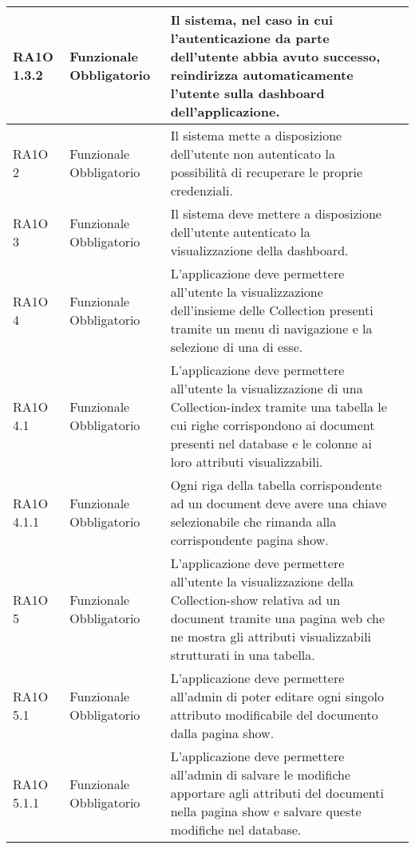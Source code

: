 \begin{center}
\begin{longtable}{ | p{2cm} | p{2cm} | p{5cm} | p{2cm} |}
        RA1O 1.3.2 & Funzionale \newline  Obbligatorio  & Il sistema, nel caso in cui l'autenticazione da parte dell'utente abbia avuto successo, reindirizza automaticamente l'utente sulla dashboard dell'applicazione.
 &  \\ \hline      
        RA1O 2  & Funzionale \newline  Obbligatorio  & Il sistema mette a disposizione dell'utente non autenticato la possibilità  di recuperare le proprie credenziali. &  \\ \hline      
        RA1O 3  & Funzionale \newline  Obbligatorio  & Il sistema deve mettere a disposizione dell'utente autenticato la visualizzazione della dashboard. &  \\ \hline      
        RA1O 4 & Funzionale \newline  Obbligatorio  & L'applicazione deve permettere all'utente la visualizzazione dell'insieme delle Collection presenti tramite un menu di navigazione e la selezione di una di esse. &  \\ \hline      
        RA1O 4.1  & Funzionale \newline  Obbligatorio  & L'applicazione deve permettere all'utente la visualizzazione di una Collection-index tramite una tabella le cui righe corrispondono ai document presenti nel database e le colonne ai loro attributi visualizzabili.  &  \\ \hline      
        RA1O 4.1.1  & Funzionale \newline  Obbligatorio  & Ogni riga della tabella corrispondente ad un document deve avere una chiave selezionabile che rimanda alla corrispondente pagina show. &  \\ \hline      
        RA1O 5  & Funzionale \newline  Obbligatorio  & L'applicazione deve permettere all'utente la visualizzazione della Collection-show relativa ad un document tramite una pagina web che ne mostra gli attributi visualizzabili strutturati in una tabella.
 &  \\ \hline      
        RA1O 5.1 & Funzionale \newline  Obbligatorio  & L'applicazione deve permettere all'admin di poter editare ogni singolo attributo modificabile del documento dalla pagina show. &  \\ \hline      
        RA1O 5.1.1  & Funzionale \newline  Obbligatorio  & L'applicazione deve permettere all'admin di salvare le modifiche apportare agli attributi del documenti nella pagina show e salvare queste modifiche nel database.

\end{longtable}
\end{center}
